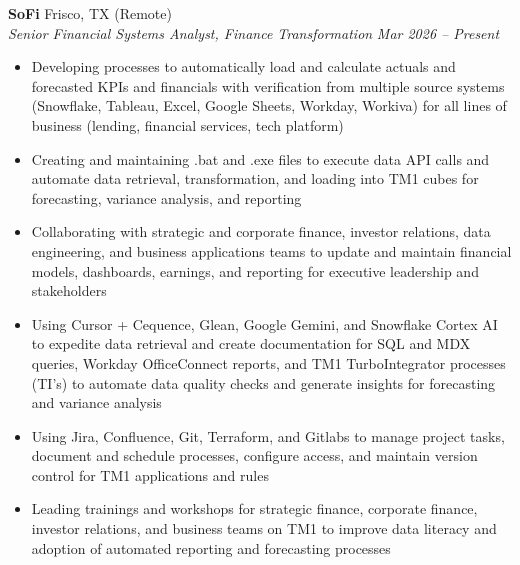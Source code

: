 \documentclass[a4paper,11pt]{article}
\begin{document}
\vspace{1mm}
\textbf{SoFi} \hfill Frisco, TX (Remote) \\
\textit{Senior Financial Systems Analyst, Finance Transformation} \hfill \textit{Mar 2026 -- Present}
\begin{itemize}
    \item Developing processes to automatically load and calculate actuals and forecasted KPIs and financials with verification from multiple source systems (Snowflake, Tableau, Excel, Google Sheets, Workday, Workiva) for all lines of business (lending, financial services, tech platform)
    \item Creating and maintaining .bat and .exe files to execute data API calls and automate data retrieval, transformation, and loading into TM1 cubes for forecasting, variance analysis, and reporting
    \item Collaborating with strategic and corporate finance, investor relations, data engineering, and business applications teams to update and maintain financial models, dashboards, earnings, and reporting for executive leadership and stakeholders
    \item Using Cursor + Cequence, Glean, Google Gemini, and Snowflake Cortex AI to expedite data retrieval and create documentation for SQL and MDX queries, Workday OfficeConnect reports, and TM1 TurboIntegrator processes (TI's) to automate data quality checks and generate insights for forecasting and variance analysis
    \item Using Jira, Confluence, Git, Terraform, and Gitlabs to manage project tasks, document and schedule processes, configure access, and maintain version control for TM1 applications and rules
    \item Leading trainings and workshops for strategic finance, corporate finance, investor relations, and business teams on TM1 to improve data literacy and adoption of automated reporting and forecasting processes
\end{itemize}
\end{document}
